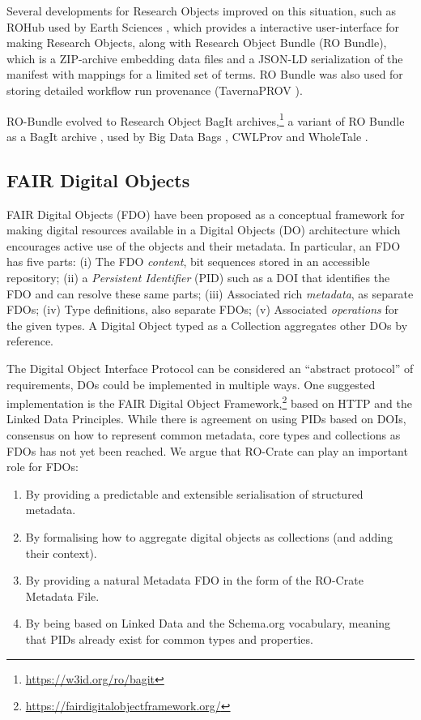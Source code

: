 \documentclass[ds,v1.1.2,openaccess]{iosart2x}%
\begin{document}
Several developments for Research Objects improved on this situation,
such as ROHub used by Earth Sciences
\cite{doi:10.1016/j.future.2019.03.046}, which provides a interactive
user-interface for making Research Objects, along with Research Object
Bundle \cite{doi:10.5281/zenodo.12586} (RO Bundle), which is a ZIP-archive
embedding data files and a JSON-LD serialization of the manifest with
mappings for a limited set of terms. RO Bundle was also used for
storing detailed workflow run provenance (TavernaPROV
\cite{doi:10.5281/zenodo.51314}).

RO-Bundle evolved to Research Object BagIt
archives,\footnote{\url{https://w3id.org/ro/bagit}} a variant of RO Bundle as a BagIt
archive \cite{doi:10.17487/rfc8493}, used by Big Data Bags
\cite{doi:10.1109/BigData.2016.7840618}, CWLProv
\cite{doi:10.1093/gigascience/giz095} and WholeTale
\cite{doi:10.3233/APC200107,doi:10.1109/eScience.2019.00068}.

\subsection{FAIR Digital Objects}

FAIR Digital Objects (FDO) \cite{doi:10.3390/publications8020021} have been
proposed as a conceptual framework for making digital resources
available in a Digital Objects (DO) architecture which encourages
active use of the objects and their metadata. In particular, an FDO has
five parts: (i) The FDO \textit{content}, bit sequences stored in an
accessible repository; (ii) a \textit{Persistent Identifier} (PID) such as a
DOI that identifies the FDO and can resolve these same parts; (iii)
Associated rich \textit{metadata}, as separate FDOs; (iv) Type definitions,
also separate FDOs; (v) Associated \textit{operations} for the given types. A
Digital Object typed as a Collection aggregates other DOs by reference.

The Digital Object Interface Protocol \cite{doip2.0} can be considered an
``abstract protocol'' of requirements, DOs could be implemented in
multiple ways. One suggested implementation is the FAIR Digital Object
Framework,\footnote{\url{https://fairdigitalobjectframework.org/}} based on HTTP and
the Linked Data Principles. While there is agreement on using PIDs
based on DOIs, consensus on how to represent common metadata, core
types and collections as FDOs has not yet been reached. We argue that
RO-Crate can play an important role for FDOs:
\begin{enumerate}
\item[1.] By providing a predictable and extensible serialisation of
structured metadata.
\item[2.] By formalising how to aggregate digital objects as collections (and
adding their context).
\item[3.] By providing a natural Metadata FDO in the form of the RO-Crate
Metadata File.
\item[4.] By being based on Linked Data and the Schema.org vocabulary, meaning
that PIDs already exist for common types and properties.
\end{enumerate}
\end{document}
